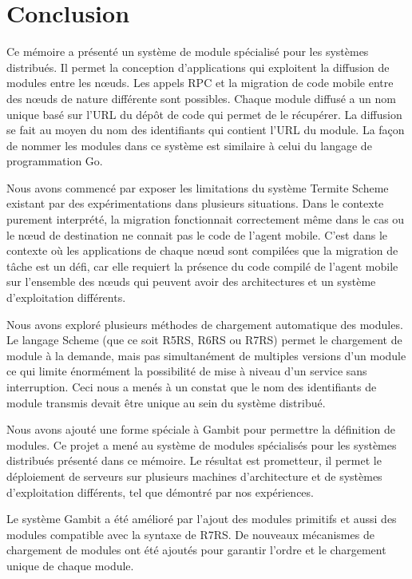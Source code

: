 
\chapter{Conclusion}

Ce mémoire a présenté un système de module spécialisé pour les systèmes
distribués. Il permet la conception d'applications qui exploitent la diffusion de
modules entre les nœuds. Les appels RPC et la migration de code mobile entre
des nœuds de nature différente sont possibles. Chaque module diffusé a un nom
unique basé sur l'URL du dépôt de code qui permet de le récupérer. La diffusion
se fait au moyen du nom des identifiants qui contient l'URL du module. La façon de nommer les
modules dans ce système est similaire à celui du langage de programmation Go.

Nous avons commencé par exposer les limitations du système Termite Scheme
existant par des expérimentations dans plusieurs situations. Dans le contexte
purement interprété, la migration fonctionnait correctement même dans le cas ou
le nœud de destination ne connait pas le code de l'agent mobile.  C'est dans le
contexte où les applications de chaque nœud sont compilées que la migration de
tâche est un défi, car elle requiert la présence du code compilé de l'agent
mobile sur l'ensemble des nœuds qui peuvent avoir des architectures et un
système d'exploitation différents.

Nous avons exploré plusieurs méthodes de chargement automatique des modules.
Le langage Scheme (que ce soit R5RS, R6RS ou R7RS) permet le chargement de
module à la demande, mais pas simultanément de multiples versions d'un module ce
qui limite énormément la possibilité de mise à niveau d'un service sans
interruption.  Ceci nous a menés à un constat que le nom des identifiants de
module transmis devait être unique au sein du système distribué.

Nous avons ajouté une forme spéciale à Gambit pour permettre la définition de
modules. Ce projet a mené au système de modules spécialisés pour les systèmes
distribués présenté dans ce mémoire. Le résultat est prometteur, il permet le
déploiement de serveurs sur plusieurs machines d'architecture et de systèmes
d'exploitation différents, tel que démontré par nos expériences.

Le système Gambit a été amélioré par l'ajout des modules primitifs et aussi des
modules compatible avec la syntaxe de R7RS. De nouveaux mécanismes de
chargement de modules ont été ajoutés pour garantir l'ordre et le chargement
unique de chaque module.

